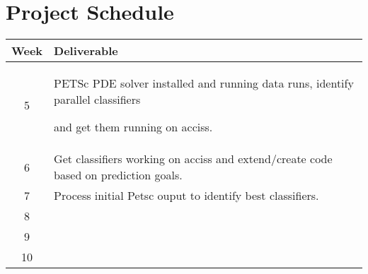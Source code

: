 \section{Project Schedule}

\begin{tabular}{c | p{14.2cm}}
Week & Deliverable\\
\hline
5 & PETSc PDE solver installed and running data runs, identify parallel classifiers \par and get them running on acciss. \\ 
6 & Get classifiers working on acciss and extend/create code based on prediction goals. \\ 
7 & Process initial Petsc ouput to identify best classifiers. \\ 
8 & \\
9 & \\
10 & \\
\end{tabular}